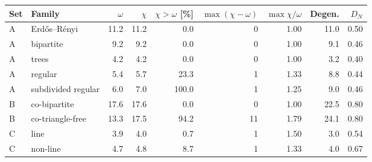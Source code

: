 \begin{tabular}{llrrrrrrr}
\toprule
Set & Family & $\omega$ & $\chi$ & $\chi>\omega$ [\%] & $\max(\chi-\omega)$ & $\max\chi/\omega$ & Degen. & $D_N$\\
\midrule
A & Erd\H{o}s--R\'enyi & 11.2 & 11.2 & 0.0 & 0 & 1.00 & 11.0 & 0.50\\
A & bipartite & 9.2 & 9.2 & 0.0 & 0 & 1.00 & 9.1 & 0.46\\
A & trees & 4.2 & 4.2 & 0.0 & 0 & 1.00 & 3.2 & 0.40\\
A & regular & 5.4 & 5.7 & 23.3 & 1 & 1.33 & 8.8 & 0.44\\
A & subdivided regular & 6.0 & 7.0 & 100.0 & 1 & 1.25 & 9.0 & 0.46\\
\midrule
B & co-bipartite & 17.6 & 17.6 & 0.0 & 0 & 1.00 & 22.5 & 0.80\\
B & co-triangle-free & 13.3 & 17.5 & 94.2 & 11 & 1.79 & 24.1 & 0.80\\
\midrule
C & line & 3.9 & 4.0 & 0.7 & 1 & 1.50 & 3.0 & 0.54\\
C & non-line & 4.7 & 4.8 & 8.7 & 1 & 1.33 & 4.0 & 0.67\\
\bottomrule
\end{tabular}
